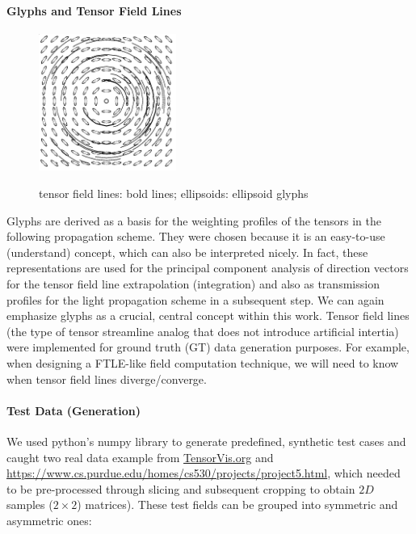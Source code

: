 \documentclass{scrartcl}
\begin{document}
\paragraph{Glyphs and Tensor Field Lines}
\begin{figure}[!t]
  \centering
 {
    \includegraphics[width=0.4\textwidth]
    {img/tensorfieldlines.png}
  }
  \caption{tensor field lines: bold lines; ellipsoids: ellipsoid glyphs}
  \label{scheme}
\end{figure}\vskip 3pt
Glyphs are derived as a basis for the weighting profiles of the tensors in the following propagation scheme. They were chosen because it is an easy-to-use (understand) concept, which can also be interpreted nicely. In fact, these representations are used for the principal component analysis of direction vectors for the tensor field line extrapolation (integration) and also as transmission profiles for the light propagation scheme in a subsequent step. We can again emphasize glyphs as a crucial, central concept within this work. Tensor field lines (the type of tensor streamline analog that does not introduce artificial intertia) were implemented for ground truth (GT) data generation purposes. For example, when designing a FTLE-like field computation technique, we will need to know when tensor field lines diverge/converge.

\paragraph{Test Data (Generation)}
We used python's numpy library to generate predefined, synthetic test cases and caught two real data example from \url{TensorVis.org} and \url{https://www.cs.purdue.edu/homes/cs530/projects/project5.html}, which needed to be pre-processed through slicing and subsequent cropping to obtain $2D$ samples ($2\times2$) matrices). These test fields can be grouped into symmetric and asymmetric ones:\\
\end{document}
